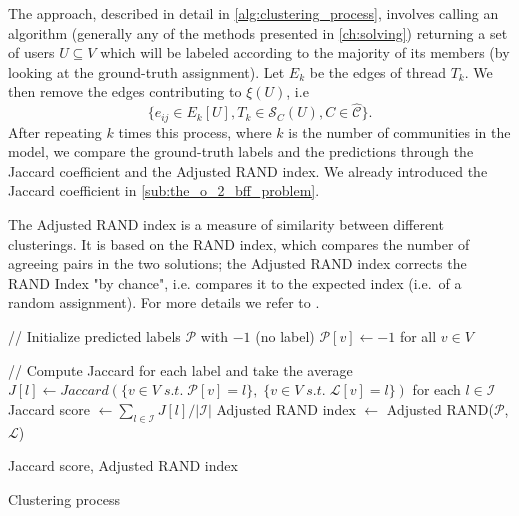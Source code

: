The approach, described in detail in \autoref{alg:clustering_process}, involves calling an algorithm (generally any of the methods presented
in \autoref{ch:solving}) returning a set of users $U \subseteq V$ which will be
labeled according to the majority of its members (by looking at the
ground-truth assignment).
Let $E_k$ be the edges of thread $T_k$. We then remove the edges contributing to $\xi(U)$, i.e\
\begin{equation*}
	\{ e_{ij} \in E_k[U], T_k \in \mathcal{S}_{C}(U), C \in \mathcal{\hat{C}}
	\}.
\end{equation*}
After repeating $k$ times this process, where $k$ is the number
of communities in the model, we compare the ground-truth labels and the
predictions through the Jaccard coefficient and the Adjusted RAND
index. We already introduced the Jaccard
coefficient in \autoref{sub:the_o_2_bff_problem}.

The Adjusted RAND index is a measure of similarity between
different clusterings. It is based on the RAND index, which compares
the number of agreeing pairs in the two solutions; the Adjusted RAND index
corrects the RAND Index "by chance", i.e. compares it to the expected index
(i.e.\ of a random assignment). For more details we
refer to \cite{CharuC.Aggarwal2013}.

\begin{algorithm}
	\SetAlgoLined

	// Initialize predicted labels $\mathcal{P} $ with $-1$ (no label)\;
	$\mathcal{P}[v] \leftarrow -1$ for all $v \in V$ \;


	// Compute Jaccard for each label and take the average \;
	$J[l] \leftarrow Jaccard( \{ v \in V \; s.t. \; \mathcal{P}[v] = l \}, \; \{ v \in
		V\; s.t. \; \mathcal{L}[v] = l \})  $ for each $l \in \mathcal{I} $ \;
	Jaccard score $\leftarrow \sum^{}_{l \in \mathcal{I} } J[l] / |\mathcal{I}|  $ \;
	Adjusted RAND index $\leftarrow $ Adjusted RAND($\mathcal{P} $, $\mathcal{L} $)
	\;

	\Return Jaccard score, Adjusted RAND index\;
	\caption{Clustering process}
	\label{alg:clustering_process}
\end{algorithm}

